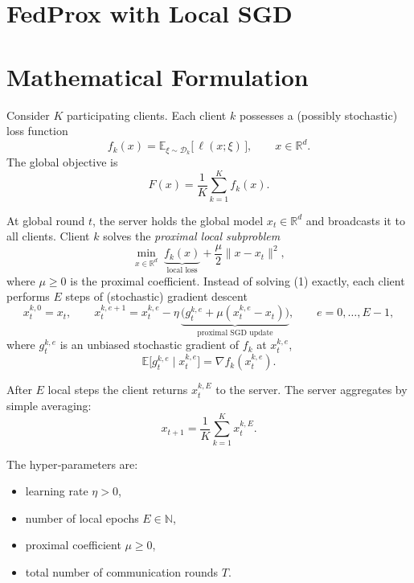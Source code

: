 \documentclass[11pt]{article}
\begin{document}
\section*{FedProx with Local SGD}

\section*{Mathematical Formulation}
Consider $K$ participating clients.  
Each client $k$ possesses a (possibly stochastic) loss function 
\[
f_k(x)=\mathbb{E}_{\xi\sim\mathcal{D}_k}\big[\,\ell(x;\xi)\,\big],
\qquad x\in\mathbb{R}^d .
\]
The global objective is 
\[
F(x)=\frac1K\sum_{k=1}^K f_k(x).
\]

At global round $t$, the server holds the global model $x_t\in\mathbb{R}^d$ and broadcasts it to all clients.  
Client $k$ solves the \emph{proximal local subproblem}
\[
\min_{x\in\mathbb{R}^d}\;
\underbrace{f_k(x)}_{\text{local loss}}
+\frac{\mu}{2}\|x-x_t\|^2,
\tag{1}
\]
where $\mu\ge 0$ is the proximal coefficient.  
Instead of solving (1) exactly, each client performs $E$ steps of (stochastic) gradient descent
\[
x_{t}^{k,0}=x_t,\qquad 
x_{t}^{k,e+1}=x_{t}^{k,e}-\eta\,\underbrace{\big(g_{t}^{k,e}+\mu (x_{t}^{k,e}-x_t)\big)}_{\text{proximal SGD update}},
\qquad e=0,\dots,E-1,
\tag{2}
\]
where $g_{t}^{k,e}$ is an unbiased stochastic gradient of $f_k$ at $x_{t}^{k,e}$,
\[
\mathbb{E}\big[g_{t}^{k,e}\mid x_{t}^{k,e}\big]=\nabla f_k(x_{t}^{k,e}).
\]

After $E$ local steps the client returns $x_{t}^{k,E}$ to the server.  
The server aggregates by simple averaging:
\[
x_{t+1}= \frac1K\sum_{k=1}^K x_{t}^{k,E}.
\tag{3}
\]

The hyper‑parameters are:
\begin{itemize}
\item learning rate $\eta>0$,
\item number of local epochs $E\in\mathbb{N}$,
\item proximal coefficient $\mu\ge 0$,
\item total number of communication rounds $T$.
\end{itemize}
\end{document}
